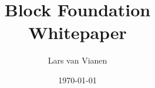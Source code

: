 \documentclass [10pt, fancyhdr, twoside] {article}
\title{%
Block Foundation \\
  \large Whitepaper}
\author{Lars van Vianen}
\date{\today}
\begin{document}



\maketitle

\begin{abstract}
\blindtext
\end{abstract}
















\nocite{*}

% 

\end{document}
